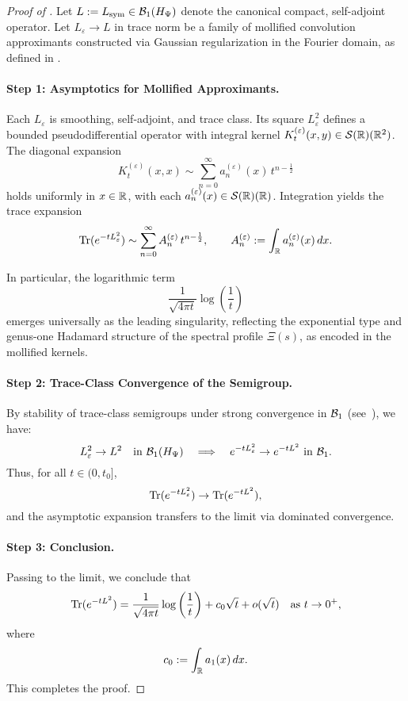 \begin{proof}[Proof of ]
Let \( L := L_{\mathrm{sym}} \in \mathcal{B}_1(H_{\Psi}) \) denote the canonical compact, self-adjoint operator. Let \( L_\varepsilon \to L \) in trace norm be a family of mollified convolution approximants constructed via Gaussian regularization in the Fourier domain, as defined in .

\paragraph{Step 1: Asymptotics for Mollified Approximants.}
Each \( L_\varepsilon \) is smoothing, self-adjoint, and trace class. Its square \( L_\varepsilon^2 \) defines a bounded pseudodifferential operator with integral kernel \( K^{(\varepsilon)}_t(x,y) \in \mathcal{S}(\mathbb{R})(\mathbb{R}^2) \). The diagonal expansion
\[
K^{(\varepsilon)}_t(x,x) \sim \sum_{n=0}^\infty a_n^{(\varepsilon)}(x)\, t^{n - \frac{1}{2}}
\]
holds uniformly in \( x \in \mathbb{R} \), with each \( a_n^{(\varepsilon)}(x) \in \mathcal{S}(\mathbb{R})(\mathbb{R}) \). Integration yields the trace expansion
\[
\operatorname{Tr}(e^{-t L_\varepsilon^2}) \sim \sum_{n=0}^\infty A_n^{(\varepsilon)}\, t^{n - \frac{1}{2}}, \qquad A_n^{(\varepsilon)} := \int_{\mathbb{R}} a_n^{(\varepsilon)}(x)\, dx.
\]

In particular, the logarithmic term
\[
\frac{1}{\sqrt{4\pi t}} \log\left( \frac{1}{t} \right)
\]
emerges universally as the leading singularity, reflecting the exponential type and genus-one Hadamard structure of the spectral profile \( \Xi(s) \), as encoded in the mollified kernels.

\paragraph{Step 2: Trace-Class Convergence of the Semigroup.}
By stability of trace-class semigroups under strong convergence in \( \mathcal{B}_1 \) (see~\cite[Thm.~3.2]{Simon2005TraceIdeals}), we have:
\[
L_\varepsilon^2 \to L^2 \quad \text{in } \mathcal{B}_1(H_{\Psi}) \quad \Longrightarrow \quad e^{-t L_\varepsilon^2} \to e^{-t L^2} \text{ in } \mathcal{B}_1.
\]
Thus, for all \( t \in (0, t_0] \),
\[
\operatorname{Tr}(e^{-t L_\varepsilon^2}) \to \operatorname{Tr}(e^{-t L^2}),
\]
and the asymptotic expansion transfers to the limit via dominated convergence.

\paragraph{Step 3: Conclusion.}
Passing to the limit, we conclude that
\[
\operatorname{Tr}(e^{-t L^2}) = \frac{1}{\sqrt{4\pi t}} \log\left( \frac{1}{t} \right) + c_0 \sqrt{t} + o(\sqrt{t}) \quad \text{as } t \to 0^+,
\]
where
\[
c_0 := \int_{\mathbb{R}} a_1(x) \, dx.
\]
This completes the proof.
\end{proof}
